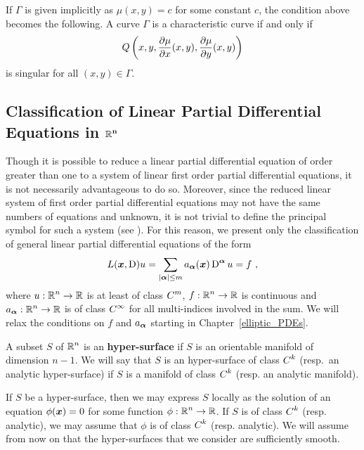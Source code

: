 If $\Gamma$ is given implicitly as $\mu(x,y) = c$ for some constant
$c$, the condition above becomes the following.
A curve $\Gamma$ is a characteristic curve if and only if
\[
Q\left(x,y, \frac{\partial{\mu}}{\partial x}(x,y), \frac{\partial{\mu}}{\partial y}(x,y) \right)
\]
is singular for all $(x,y) \in \Gamma$.

\subsection{Classification of Linear Partial Differential Equations in
$\displaystyle \mathbf{\mathbb{R}^n}$}

Though it is possible to reduce a linear partial differential equation
of order greater than one to a system of linear first order partial
differential equations, it is not necessarily
advantageous to do so.  Moreover, since the reduced linear system of
first order partial differential equations may not have the same
numbers of equations and unknown, it is not trivial to define the
principal symbol for such a system (see \cite{RenRog}).  For this
reason, we present only the
classification of general linear partial differential equations of the form
\begin{equation} \label{classif_gen_class}
L({\bm{x}}, \operatorname{D})u = \sum_{|{\bm{\alpha}}|\leq m} a_{{\bm{\alpha}}}({\bm{x}})
\operatorname{D}^{{\bm{\alpha}}} u = f \ ,
\end{equation}
where $\displaystyle u:\mathbb{R}^n \rightarrow \mathbb{R}$ is at least of class
$\displaystyle C^m$, $\displaystyle f:\mathbb{R}^n \rightarrow \mathbb{R}$ is continuous and
$\displaystyle a_{{\bm{\alpha}}}:\mathbb{R}^n \rightarrow \mathbb{R}$ is of class
$\displaystyle C^\infty$ for all multi-indices involved in the sum.
We will relax the conditions on $f$
and $a_{{\bm{\alpha}}}$ starting in Chapter~\ref{elliptic_PDEs}.

\begin{defn}
A subset $S$ of $\displaystyle \mathbb{R}^n$ is an
{\bfseries hyper-surface} 
if $S$ is an orientable manifold of dimension $n-1$.  We will say that
$S$ is an hyper-surface of class $\displaystyle C^k$ (resp.\ an analytic
hyper-surface) if $S$ is a manifold of class $\displaystyle C^k$
(resp. an analytic manifold).
\end{defn}

If $S$ be a hyper-surface, then we may express $S$ locally as the
solution of an equation $\phi({\bm{x}}) = 0$ for some function
$\displaystyle \phi:\mathbb{R}^n \to \mathbb{R}$.  If $S$ is of class
$\displaystyle C^k$ (resp. analytic), we may assume that
$\phi$ is of class $\displaystyle C^k$ (resp. analytic).  We will
assume from now on that the hyper-surfaces that we consider are
sufficiently smooth.

